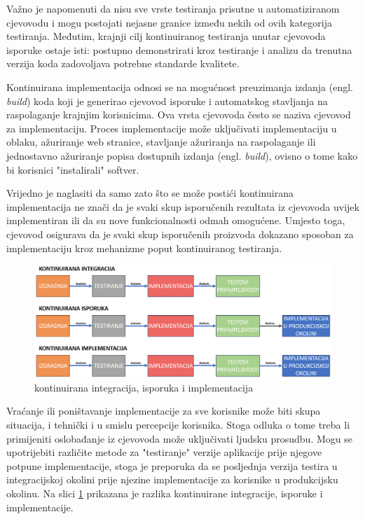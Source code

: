 \documentclass[a4paper,12pt,oneside]{article}
\begin{document}
Važno je napomenuti da nisu sve vrste testiranja prisutne u automatiziranom cjevovodu i mogu postojati nejasne granice između nekih od ovih kategorija testiranja. Međutim, krajnji cilj kontinuiranog testiranja unutar cjevovoda isporuke ostaje isti: postupno demonstrirati kroz testiranje i analizu da trenutna verzija koda zadovoljava potrebne standarde kvalitete.

Kontinuirana implementacija odnosi se na mogućnost preuzimanja izdanja (engl. \textit{build}) koda koji je generirao cjevovod isporuke i automatskog stavljanja na raspolaganje krajnjim korisnicima. Ova vrsta cjevovoda često se naziva cjevovod za implementaciju. Proces implementacije može uključivati implementaciju u oblaku, ažuriranje web stranice, stavljanje ažuriranja na raspolaganje ili jednostavno ažuriranje popisa dostupnih izdanja (engl. \textit{build}), ovisno o tome kako bi korisnici "instalirali" softver.

Vrijedno je naglasiti da samo zato što se može postići kontinuirana implementacija ne znači da je svaki skup isporučenih rezultata iz cjevovoda uvijek implementiran ili da su nove funkcionalnosti odmah omogućene. Umjesto toga, cjevovod osigurava da je svaki skup isporučenih proizvoda dokazano sposoban za implementaciju kroz mehanizme poput kontinuiranog testiranja.

\begin{figure}[ht!] %
	\centering %
	\includegraphics[scale=0.36]{./Slike/kontinuirana integracija, isporuka i implementacija.png} %
	\caption{kontinuirana integracija, isporuka i implementacija \cite{ci_tools_slika} \label{f:kontinuirana integracija, isporuka i implementacija}} %
\end{figure}

Vraćanje ili poništavanje implementacije za sve korisnike može biti skupa situacija, i tehnički i u smislu percepcije korisnika. Stoga odluka o tome treba li primijeniti oslobađanje iz cjevovoda može uključivati ljudsku prosudbu. Mogu se upotrijebiti različite metode za "testiranje" verzije aplikacije prije njegove potpune implementacije, stoga je preporuka da se posljednja verzija testira u integracijskoj okolini prije njezine implementacije za korisnike u produkcijsku okolinu.\cite{brent-2020-CI/CD} Na slici \ref{f:kontinuirana integracija, isporuka i implementacija} prikazana je razlika kontinuirane integracije, isporuke i implementacije.
\end{document}
